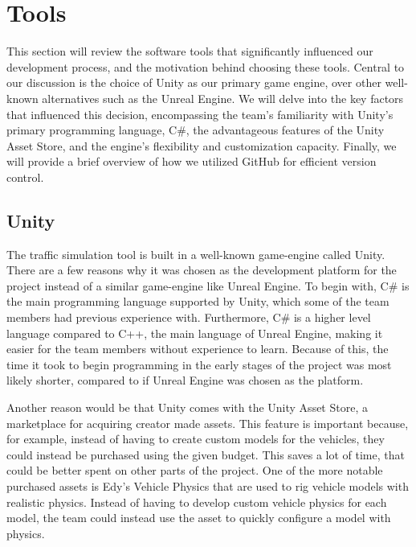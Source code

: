 
\section{Tools}
    This section will review the software tools that significantly influenced our development process, and the motivation behind choosing these tools. Central to our discussion is the choice of Unity as our primary game engine, over other well-known alternatives such as the Unreal Engine. We will delve into the key factors that influenced this decision, encompassing the team's familiarity with Unity's primary programming language, C\#, the advantageous features of the Unity Asset Store, and the engine's flexibility and customization capacity. Finally, we will provide a brief overview of how we utilized GitHub for efficient version control.

\subsection{Unity}
    The traffic simulation tool is built in a well-known game-engine called Unity. There are a few reasons why it was chosen as the development platform for the project instead of a similar game-engine like Unreal Engine. To begin with, C\# is the main programming language supported by Unity, which some of the team members had previous experience with. Furthermore, C\# is a higher level language compared to C++, the main language of Unreal Engine, making it easier for the team members without experience to learn. Because of this, the time it took to begin programming in the early stages of the project was most likely shorter, compared to if Unreal Engine was chosen as the platform.

    Another reason would be that Unity comes with the Unity Asset Store, a marketplace for acquiring creator made assets. This feature is important because, for example, instead of having to create custom models for the vehicles, they could instead be purchased using the given budget. This saves a lot of time, that could be better spent on other parts of the project. One of the more notable purchased assets is Edy's Vehicle Physics\cite{edy} that are used to rig vehicle models with realistic physics. Instead of having to develop custom vehicle physics for each model, the team could instead use the asset to quickly configure a model with physics.

